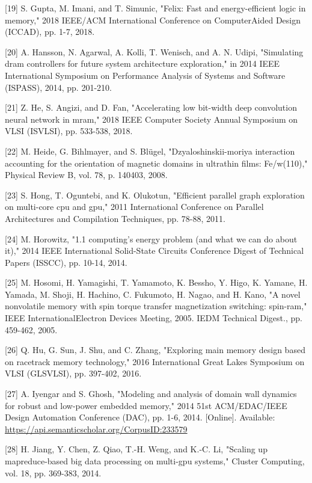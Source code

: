 \documentclass[10pt]{article}
\begin{document}
[19] S. Gupta, M. Imani, and T. Simunic, "Felix: Fast and energy-efficient logic in memory," 2018 IEEE/ACM International Conference on ComputerAided Design (ICCAD), pp. 1-7, 2018.

[20] A. Hansson, N. Agarwal, A. Kolli, T. Wenisch, and A. N. Udipi, "Simulating dram controllers for future system architecture exploration," in 2014 IEEE International Symposium on Performance Analysis of Systems and Software (ISPASS), 2014, pp. 201-210.

[21] Z. He, S. Angizi, and D. Fan, "Accelerating low bit-width deep convolution neural network in mram," 2018 IEEE Computer Society Annual Symposium on VLSI (ISVLSI), pp. 533-538, 2018.

[22] M. Heide, G. Bihlmayer, and S. Blügel, "Dzyaloshinskii-moriya interaction accounting for the orientation of magnetic domains in ultrathin films: Fe/w(110)," Physical Review B, vol. 78, p. 140403, 2008.

[23] S. Hong, T. Oguntebi, and K. Olukotun, "Efficient parallel graph exploration on multi-core cpu and gpu," 2011 International Conference on Parallel Architectures and Compilation Techniques, pp. 78-88, 2011.

[24] M. Horowitz, "1.1 computing's energy problem (and what we can do about it)," 2014 IEEE International Solid-State Circuits Conference Digest of Technical Papers (ISSCC), pp. 10-14, 2014.

[25] M. Hosomi, H. Yamagishi, T. Yamamoto, K. Bessho, Y. Higo, K. Yamane, H. Yamada, M. Shoji, H. Hachino, C. Fukumoto, H. Nagao, and H. Kano, "A novel nonvolatile memory with spin torque transfer magnetization switching: spin-ram," IEEE InternationalElectron Devices Meeting, 2005. IEDM Technical Digest., pp. 459-462, 2005.

[26] Q. Hu, G. Sun, J. Shu, and C. Zhang, "Exploring main memory design based on racetrack memory technology," 2016 International Great Lakes Symposium on VLSI (GLSVLSI), pp. 397-402, 2016.

[27] A. Iyengar and S. Ghosh, "Modeling and analysis of domain wall dynamics for robust and low-power embedded memory," 2014 51st ACM/EDAC/IEEE Design Automation Conference (DAC), pp. 1-6, 2014. [Online]. Available: \href{https://api.semanticscholar.org/CorpusID:233579}{https://api.semanticscholar.org/CorpusID:233579}

[28] H. Jiang, Y. Chen, Z. Qiao, T.-H. Weng, and K.-C. Li, "Scaling up mapreduce-based big data processing on multi-gpu systems," Cluster Computing, vol. 18, pp. 369-383, 2014.
\end{document}
